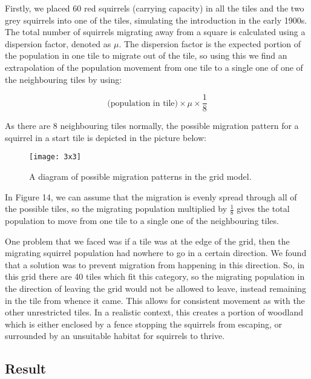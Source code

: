 \documentclass{article}
\begin{document}
Firstly, we placed 60 red squirrels (carrying capacity) in all the tiles and the two grey squirrels into one of the tiles, simulating the introduction in the early 1900s. The total number of squirrels migrating away from a square is calculated using a dispersion factor, denoted as ${\mu}$. The dispersion factor is the expected portion of the population in one tile to migrate out of the tile, so using this we  find an extrapolation of the population movement from one tile to a single one of  one of the neighbouring tiles by using: 

$$\textrm{(population in tile)} \times \mu \times \frac{1}{8}$$

As there are 8 neighbouring tiles normally, the possible migration pattern for a squirrel in a start tile is depicted in the picture below:

\begin{figure}[H]
\begin{center}
\texttt{[image: 3x3]}
\caption{A diagram of possible migration patterns in the grid model.}
\end{center}
\end{figure}

In Figure 14, we can assume that the migration is evenly spread through all of the possible tiles, so the migrating population multiplied by $\frac{1}{8}$ gives the total population to move from one tile to a single one of the neighbouring tiles. 

One problem that we faced was if a tile was at the edge of the grid, then the migrating squirrel population had nowhere to go in a certain direction. We found that a solution was to prevent migration from happening in this direction. So, in this grid there are 40 tiles which fit this category, so the migrating population in the direction of leaving the grid would not be allowed to leave, instead remaining in the tile from whence it came. This allows for consistent movement as with the other unrestricted tiles. In a realistic context, this creates a portion of woodland which is either enclosed by a fence stopping the squirrels from escaping, or surrounded by an unsuitable habitat for squirrels to thrive.

\subsection{\textbf{Result}}
\end{document}
